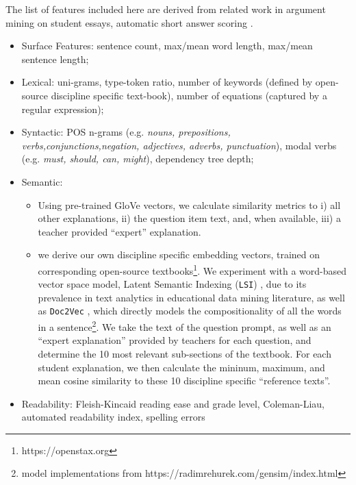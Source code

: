\documentclass[notitlepage,12pt]{jedm}
\begin{document}
The list of features included here are derived from related work in argument 
mining \cite{habernal_which_2016,persing_end--end_2016} on student 
essays, automatic short answer scoring \cite{mohler_text--text_2009}.

\begin{itemize}
	
	\item Surface Features: 
	sentence count, 
	max/mean word length, 
	max/mean sentence length;
	
	\item Lexical: 
	uni-grams, 
	type-token ratio, 
	number of keywords (defined by open-source discipline specific 
	text-book), 
	number of equations (captured by a regular expression);
	
	\item Syntactic: 
	POS n-grams (e.g. \textit{nouns, prepositions, 
		verbs,conjunctions,negation, adjectives, adverbs, punctuation}), 
	modal verbs (e.g. \textit{must, should, can, might}),
	dependency tree depth;
	
	\item Semantic:
	\begin{itemize}
		\item Using pre-trained GloVe \cite{pennington_glove:_2014} vectors, we 
		calculate similarity metrics to i) all other explanations, ii) the 
		question item text, and, when available, iii) a teacher provided 
		``expert'' explanation.
		\item we derive our own discipline specific embedding vectors, trained 
		on corresponding open-source textbooks\footnote{https://openstax.org}. 
		We experiment with a word-based vector space model, Latent Semantic 
		Indexing (\verb|LSI|) \cite{deerwester_indexing_1990}, due to its 
		prevalence in text analytics in educational data mining literature, as 
		well as \verb|Doc2Vec| \cite{le_distributed_2014}, which directly 
		models the compositionality of all the words in a 
		sentence\footnote{model implementations from 
		https://radimrehurek.com/gensim/index.html}.
		We take the text of the question prompt, as well as an ``expert 
		explanation'' provided by teachers for each question, and determine the 
		10 most relevant sub-sections of the textbook.
		For each student explanation, we then calculate the mininum, maximum, 
		and mean cosine similarity to these 10 discipline specific ``reference 
		texts''.
		 
	\end{itemize}
		
	
	\item Readability:
	Fleish-Kincaid reading ease and grade level,
	Coleman-Liau,
	automated readability index, 
	spelling errors
	
\end{itemize}
\end{document}
